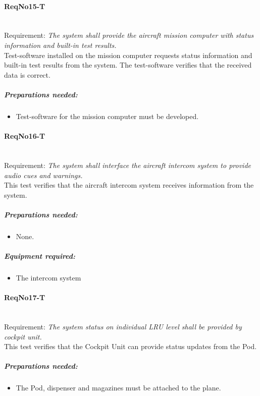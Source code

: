 \paragraph{ReqNo15-T}\mbox{}\\ %
Requirement: \textit{The system shall provide the aircraft mission computer
with status information and built-in test results.}
\\
Test-software installed on the mission computer requests status information and built-in test results from the system. The test-software verifies that the received data is correct.
\\
	\subparagraph{Preparations needed:}
	\begin{itemize}
	\item Test-software for the mission computer must be developed.
	\end{itemize} 

\paragraph{ReqNo16-T}\mbox{}\\ %
Requirement: \textit{The system shall interface the aircraft intercom system to provide audio cues and warnings.}
\\
This test verifies that the aircraft intercom system receives information from the system.
\\
	\subparagraph{Preparations needed:}
	\begin{itemize}
	\item None.
	\end{itemize}

	\subparagraph{Equipment required:}
	\begin{itemize}
	\item The intercom system
	\end{itemize}


\paragraph{ReqNo17-T}\mbox{}\\ %
Requirement: \textit{The system status on individual LRU level shall be
provided by cockpit unit.}\\
This test verifies that the Cockpit Unit can provide status updates from the Pod.\\

	\subparagraph{Preparations needed:}
	\begin{itemize}
	\item The Pod, dispenser and magazines must be attached to the plane.
	\end{itemize}

